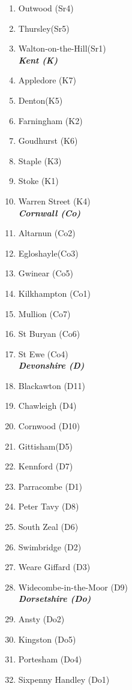 \begin{refsection}
\begin{multicols}{2}
\begin{enumerate}
	    \item Outwood (Sr4)	
	    \item Thursley(Sr5)	
	    \item Walton-on-the-Hill(Sr1)\\
	    \emph{\textbf{Kent (K)}}				
	   \item Appledore (K7)	
	   \item Denton(K5)	
	   \item Farningham (K2)	
	   \item Goudhurst (K6)	
	   \item Staple (K3)	
	   \item Stoke (K1)	
	   \item Warren Street (K4)\\
	   \emph{\textbf{Cornwall (Co)}}			
	   \item Altarnun (Co2)	
	   \item Egloshayle(Co3)	
	   \item Gwinear (Co5)	
	   \item Kilkhampton (Co1)	
	   \item Mullion (Co7)	
	   \item St Buryan (Co6)	
	   \item St Ewe (Co4)\\
	   \emph{\textbf{Devonshire (D)}}	
	   \item Blackawton (D11)	
	   \item Chawleigh (D4)	
	   \item Cornwood (D10)	
	   \item Gittisham(D5)	
	   \item Kennford (D7)	
	   \item Parracombe (D1) 	
	   \item Peter Tavy (D8)
	   \item South Zeal (D6)	
	   \item Swimbridge (D2)	
	   \item Weare Giffard (D3)	
	   \item Widecombe-in-the-Moor (D9)\\
	   \emph{\textbf{Dorsetshire (Do)}}		
	   \item Ansty (Do2)	
	   \item Kingston (Do5)	
	   \item Portesham (Do4)	
	   \item Sixpenny Handley (Do1)	

\end{enumerate}
\end{multicols}
\end{refsection}
